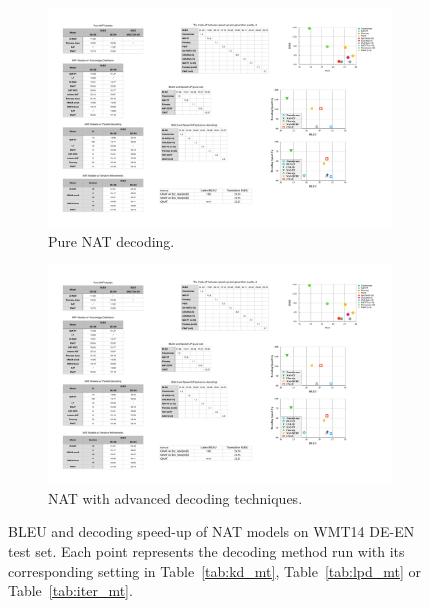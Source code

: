 \begin{figure}[tbp]
    \begin{subfigure}[t]{0.495\linewidth}
    \includegraphics[width=1.0\linewidth]{figures/pure-speed.pdf}
    \caption{Pure NAT decoding.}
    \label{fig:pure_speed}
    \end{subfigure}
    \begin{subfigure}[t]{0.495\linewidth}
    \includegraphics[width=1.0\linewidth]{figures/adv-speed.pdf}
    \caption{NAT with advanced decoding techniques.}
    \centering
    \label{fig:adv_speed}
\end{subfigure}
\caption{BLEU and decoding speed-up of NAT models on WMT14 DE-EN test set. Each point represents the decoding method run with its corresponding setting in Table~\ref{tab:kd_mt}, Table~\ref{tab:lpd_mt} or Table~\ref{tab:iter_mt}. }
\label{fig:speed}
\end{figure}
